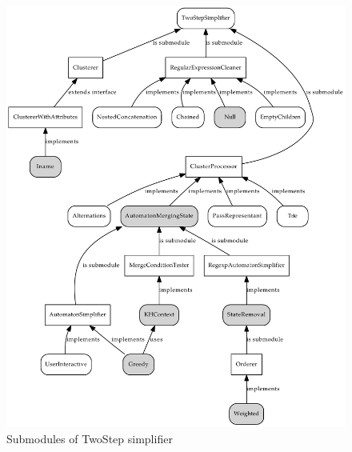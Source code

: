\documentclass[a4paper,10pt,oneside]{article}
\newcommand{\myscale}{0.74}
\begin{document}
\begin{figure}
	\centering\includegraphics[scale=\myscale]{twostep_modules_complete}
	\caption{Submodules of TwoStep simplifier} \label{twostep_modules_complete}
\end{figure}

\nocite{*}


\end{document}
